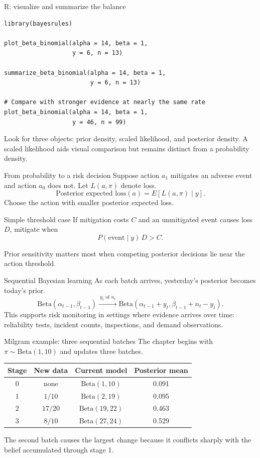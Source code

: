 \documentclass[aspectratio=43,11pt]{beamer}
\begin{document}
\begin{frame}[fragile]{R: visualize and summarize the balance}
\begin{lstlisting}
library(bayesrules)

plot_beta_binomial(alpha = 14, beta = 1,
                   y = 6, n = 13)

summarize_beta_binomial(alpha = 14, beta = 1,
                        y = 6, n = 13)

# Compare with stronger evidence at nearly the same rate
plot_beta_binomial(alpha = 14, beta = 1,
                   y = 46, n = 99)
\end{lstlisting}
Look for three objects: prior density, scaled likelihood, and posterior density.
A scaled likelihood aids visual comparison but remains distinct from a probability density.
\end{frame}

\begin{frame}{From probability to a risk decision}
Suppose action $a_1$ mitigates an adverse event and action $a_0$ does not. Let $L(a,\pi)$ denote loss.
\[
\text{Posterior expected loss}(a)=E[L(a,\pi)\mid y].
\]
Choose the action with smaller posterior expected loss.
\begin{block}{Simple threshold case}
If mitigation costs $C$ and an unmitigated event causes loss $D$, mitigate when
\[
P(\text{event}\mid y)\,D > C.
\]
\end{block}
Prior sensitivity matters most when competing posterior decisions lie near the action threshold.
\end{frame}

\begin{frame}{Sequential Bayesian learning}
As each batch arrives, yesterday's posterior becomes today's prior.
\[
\mathrm{Beta}(\alpha_{t-1},\beta_{t-1})
\xrightarrow{\ y_t\text{ of }n_t\ }
\mathrm{Beta}(\alpha_{t-1}+y_t,\beta_{t-1}+n_t-y_t).
\]
This supports risk monitoring in settings where evidence arrives over time: reliability tests, incident counts, inspections, and demand observations.
\end{frame}

\begin{frame}{Milgram example: three sequential batches}
The chapter begins with $\pi\sim\mathrm{Beta}(1,10)$ and updates three batches.
\begin{center}
\begin{tabular}{cccc}
\toprule
Stage & New data & Current model & Posterior mean \\
\midrule
0 & none & $\mathrm{Beta}(1,10)$ & 0.091 \\
1 & $1/10$ & $\mathrm{Beta}(2,19)$ & 0.095 \\
2 & $17/20$ & $\mathrm{Beta}(19,22)$ & 0.463 \\
3 & $8/10$ & $\mathrm{Beta}(27,24)$ & 0.529 \\
\bottomrule
\end{tabular}
\end{center}
The second batch causes the largest change because it conflicts sharply with the belief accumulated through stage 1.
\end{frame}
\end{document}
